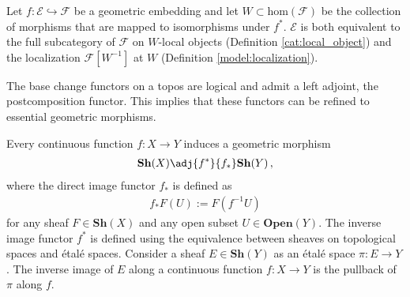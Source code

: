     \begin{property}\label{topos:characterization_embedding}
        Let $f:\mathcal{E}\hookrightarrow\mathcal{F}$ be a geometric embedding and let $W\subset\mathrm{hom}(\mathcal{F})$ be the collection of morphisms that are mapped to isomorphisms under $f^*$. $\mathcal{E}$ is both equivalent to the full subcategory of $\mathcal{F}$ on $W$-local objects (Definition \ref{cat:local_object}) and the localization $\mathcal{F}[W^{-1}]$ at $W$ (Definition \ref{model:localization}).
    \end{property}

    \begin{property}
        The base change functors on a topos are logical and admit a left adjoint, the postcomposition functor. This implies that these functors can be refined to essential geometric morphisms.
    \end{property}

    \begin{example}\label{topos:topological_spaces}
        Every continuous function $f:X\rightarrow Y$ induces a geometric morphism
        \begin{gather}
            \mathbf{Sh}(X)\adj{f^*}{f_*}\mathbf{Sh}(Y)\,,
        \end{gather}
        where the direct image functor $f_*$ is defined as
        \begin{gather}
            f_*F(U) := F(f^{-1}U)
        \end{gather}
        for any sheaf $F\in\mathbf{Sh}(X)$ and any open subset $U\in\mathbf{Open}(Y)$. The inverse image functor $f^*$ is defined using the equivalence between sheaves on topological spaces and \'etal\'e spaces. Consider a sheaf $E\in\mathbf{Sh}(Y)$ as an \'etal\'e space $\pi:E\rightarrow Y$. The inverse image of $E$ along a continuous function $f:X\rightarrow Y$ is the pullback of $\pi$ along $f$.
    \end{example}

